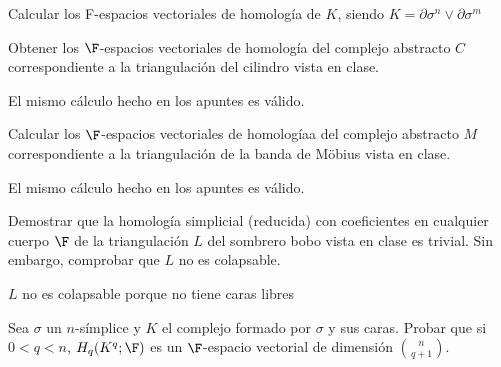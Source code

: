 \documentclass[twoside]{article}
\begin{document}
\newpage

\begin{ejercicio}{2.9}
Calcular los F-espacios vectoriales de homología de $K$, siendo $K =
\partial\sigma^n
∨
\partial σ^m$
\end{ejercicio}
\begin{solucion}

\end{solucion}

\newpage

\begin{ejercicio}{2.10}
Obtener los $\F$-espacios vectoriales de homología del complejo abstracto
$C$ correspondiente a la triangulación del cilindro vista en clase.
\end{ejercicio}
\begin{solucion}
El mismo cálculo hecho en los apuntes es válido.
\end{solucion}

\newpage

\begin{ejercicio}{2.11}
Calcular los $\F$-espacios vectoriales de homologíaa del complejo abstracto
$M$ correspondiente a la triangulación de la banda de Möbius vista en clase.
\end{ejercicio}
\begin{solucion}
El mismo cálculo hecho en los apuntes es válido.
\end{solucion}

\newpage

\begin{ejercicio}{2.12}
Demostrar que la homología simplicial (reducida) con coeficientes en
cualquier cuerpo $\F$ de la triangulación $L$ del sombrero bobo vista en clase es trivial. Sin
embargo, comprobar que $L$ no es colapsable.
\end{ejercicio}
\begin{solucion}


$L$ no es colapsable porque no tiene caras libres
\end{solucion}

\newpage

\begin{ejercicio}{2.13}
Sea $σ$ un $n$-símplice y $K$ el complejo formado por $σ$ y sus caras. Probar
que si $0 < q < n$, $H_q(K^q
; \F)$ es un $\F$-espacio vectorial de dimensión $\binom{n}
{q+1}$.
\end{ejercicio}
\begin{solucion}

\end{solucion}
\end{document}

